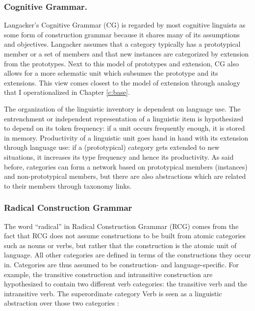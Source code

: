 \subsubsection{Cognitive Grammar.}
Langacker's Cognitive Grammar (CG) is regarded by most cognitive linguists as some form of construction grammar because it shares many of its assumptions and objectives. Langacker assumes that a category typically has a prototypical member or a set of members and that new instances are categorized by extension from the prototypes. Next to this model of prototypes and extension, CG also allows for a more schematic unit which subsumes the prototype and its extensions. This view comes closest to the model of extension through analogy that I operationalized in Chapter \ref{c:base}.

The organization of the linguistic inventory is dependent on language use. The entrenchment or independent representation of a linguistic item is hypothesized to depend on its token frequency: if a unit occurs frequently enough, it is stored in memory. Productivity of a linguistic unit goes hand in hand with its extension through language use: if a (prototypical) category gets extended to new situations, it increases its type frequency and hence its productivity. As said before, categories can form a network based on prototypical members (instances) and non-prototypical members, but there are also abstractions which are related to their members through taxonomy links.


\subsubsection{Radical Construction Grammar}
The word ``radical'' in Radical Construction Grammar (RCG) comes from the fact that RCG does not assume constructions to be built from atomic categories such as nouns or verbs, but rather that the construction is the atomic unit of language. All other categories are defined in terms of the constructions they occur in. Categories are thus assumed to be construction- and language-specific. For example, the transitive construction and intransitive construction are hypothesized to contain two different verb categories: the transitive verb and the intransitive verb. The superordinate category Verb is seen as a linguistic abstraction over those two categories \citep[287--288]{croft04cognitive}:

